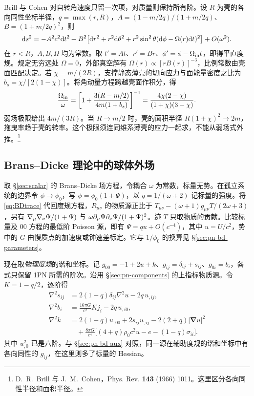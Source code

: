 Brill 与 Cohen 对自转角速度只留一次项，对质量则保持所有阶。设 $R$ 为壳的各向同性坐标半径，$q=\max(r,R)$，$A=(1-m/2q)/(1+m/2q)$、$B=(1+m/2q)^2$，则
\[
 \dd s^2=-A^2c^2\dd t^2+B^2\bigl[\dd r^2+r^2\dd\theta^2+
 r^2\sin^2\theta(\dd\phi-\Omega(r)\dd t)^2\bigr]+O(\omega^2).
\]
在 $r<R$，$A,B,\Omega$ 均为常数。取 $t'=At$、$r'=Br$、$\phi'=\phi-\Omega_{\rm in} t$，即得平直度规。规定无穷远处 $\Omega=0$，外部真空解有 $\Omega(r)\propto[rB(r)]^{-3}$，比例常数由壳面匹配决定。若 $\chi=m/(2R)$，支撑静态薄壳的切向应力与面能量密度之比为 $b_s=\chi/[2(1-\chi)]$。将角动量方程跨越壳面作积分，得
\[
 \frac{\Omega_{\rm in}}{\omega}
 =\left[1+\frac{3(R-m/2)}{4m(1+b_s)}\right]^{-1}
 =\frac{4\chi(2-\chi)}{(1+\chi)(3-\chi)} .
\]
弱场极限给出 $4m/(3R)$。当 $R\to m/2$ 时，壳的面积半径 $R(1+\chi)^2\to2m$，拖曳率趋于壳的转率。这个极限须连同维系薄壳的应力一起求，不能从弱场式外推。\footnote{D.~R.~Brill 与 J.~M.~Cohen，Phys. Rev. \textbf{143} (1966) 1011。这里区分各向同性半径和面积半径。}

\subsection{Brans--Dicke 理论中的球体外场}\label{sec:pn-bd}

取 \S\ref{sec:scalar} 的 Brans--Dicke 场方程，令耦合 $\omega$ 为常数，标量无势。在孤立系统的边界令 $\phi\to\phi_0$，写 $\phi=\phi_0(1+\Psi)$，以 $q=1/(\omega+2)$ 记标量的强度。将 \eqref{eq:BDtrace} 代回度规方程，$R_{\mu\nu}$ 的物质源正比于 $T_{\mu\nu}-(\omega+1)g_{\mu\nu}T/(2\omega+3)$，另有 $\nabla_\mu\nabla_\nu\Psi/(1+\Psi)$ 与 $\omega\partial_\mu\Psi\partial_\nu\Psi/(1+\Psi)^2$。迹 $T$ 只取物质的贡献。比较标量及 $00$ 方程的最低阶 Poisson 源，即有 $\Psi=q u+O(c^{-4})$，其中 $u=U/c^2$，势中的 $G$ 由慢质点的加速度或钟速差标定。它与 $1/\phi_0$ 的换算见 \S\ref{sec:pn-bd-parameters}。

现在取\emph{物理度规}的谐和坐标。记 $g_{00}=-1+2u+k$、$g_{ij}=\delta_{ij}+s_{ij}$、$g_{0i}=b_i$，各式只保留 1PN 所需的阶次。沿用 \S\ref{sec:pn-components} 的上指标物质源。令 $K=1-q/2$，逐阶得
\begin{align*}
 \nabla^2s_{ij}&=2(1-q)\delta_{ij}\nabla^2u-2q\,u_{,ij},\\
 \nabla^2 b_i&=\frac{16\pi G}{c^3}Kj_i-2q\,u_{,i0},\\
 \nabla^2k&=2(1-q)u_{,00}+2s_{ij}u_{,ij}-2(2+q)|\bm\nabla u|^2
 \\[-2pt]
 &\quad +\frac{8\pi G}{c^4}\big[(4+q)\rho_0c^2u-e-(1-q)\sigma_{ii}\big].
\end{align*}
其中 $u_{,0}^2$ 已是六阶。与 \S\ref{sec:pn-bd-aux} 对照，同一源在辅助度规的谐和坐标中有各向同性的 $g_{ij}$，在这里则多了标量的 Hessian。

